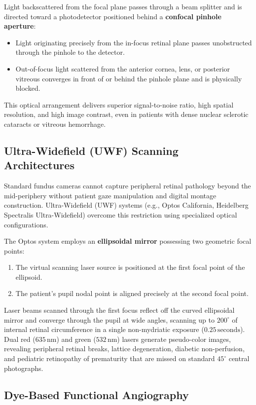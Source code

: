 \documentclass[11pt,a4paper]{article}
\begin{document}
Light backscattered from the focal plane passes through a beam splitter and is directed toward a photodetector positioned behind a \textbf{confocal pinhole aperture}:
\begin{itemize}[leftmargin=*]
    \item Light originating precisely from the in-focus retinal plane passes unobstructed through the pinhole to the detector.
    \item Out-of-focus light scattered from the anterior cornea, lens, or posterior vitreous converges in front of or behind the pinhole plane and is physically blocked.
\end{itemize}
This optical arrangement delivers superior signal-to-noise ratio, high spatial resolution, and high image contrast, even in patients with dense nuclear sclerotic cataracts or vitreous hemorrhage.

\subsection{Ultra-Widefield (UWF) Scanning Architectures}

Standard fundus cameras cannot capture peripheral retinal pathology beyond the mid-periphery without patient gaze manipulation and digital montage construction. Ultra-Widefield (UWF) systems (e.g., Optos California, Heidelberg Spectralis Ultra-Widefield) overcome this restriction using specialized optical configurations.

The Optos system employs an \textbf{ellipsoidal mirror} possessing two geometric focal points:
\begin{enumerate}[leftmargin=*]
    \item The virtual scanning laser source is positioned at the first focal point of the ellipsoid.
    \item The patient's pupil nodal point is aligned precisely at the second focal point.
\end{enumerate}
Laser beams scanned through the first focus reflect off the curved ellipsoidal mirror and converge through the pupil at wide angles, scanning up to $200^\circ$ of internal retinal circumference in a single non-mydriatic exposure ($0.25\,\text{seconds}$). Dual red ($635\,\text{nm}$) and green ($532\,\text{nm}$) lasers generate pseudo-color images, revealing peripheral retinal breaks, lattice degeneration, diabetic non-perfusion, and pediatric retinopathy of prematurity that are missed on standard $45^\circ$ central photographs.

\subsection{Dye-Based Functional Angiography}
\end{document}
